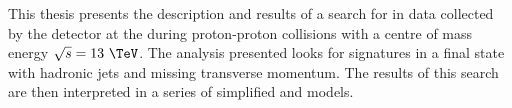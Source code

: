 This thesis presents the description and results of a search for \SUSY
in data collected by the \CMS detector at the \LHC during
proton-proton collisions with a centre of mass energy $\sqrt{s} =
13~\tev$.  The analysis presented looks for \SUSY signatures in a
final state with hadronic jets and missing transverse momentum. The
results of this search are then interpreted in a series of simplified
\SUSY and \DM models.

%
%

%

